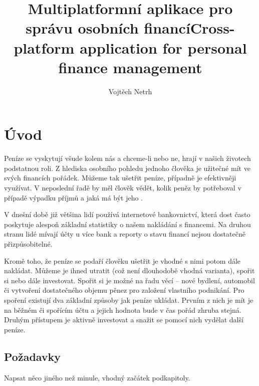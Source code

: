 \documentclass[
  biblatex,
  figures=true,
  tables=false,
  glossaries,
  index
]{kidiplom}
\title{Multiplatformní aplikace pro správu osobních financí}
\title[english]{Cross-platform application for personal finance management}
\author{Vojtěch Netrh}
\begin{document}
\maketitle



\newcommand{\BibLaTeX}{\textsc{Bib}\LaTeX}


\section{Úvod}
Peníze se vyskytují všude kolem nás a chceme-li nebo ne, hrají v našich životech podstatnou roli. Z hlediska osobního pohledu jednoho člověka je užitečné mít ve svých financích pořádek. Můžeme tak ušetřit peníze, případně je efektivněji využívat. V neposlední řadě by měl člověk vědět, kolik peněz by potřeboval v případě výpadku příjmů a jaká má být jeho .

V dnešní době již většina lidí používá internetové bankovnictví, která dost často poskytuje alespoň základní statistiky o našem nakládání s financemi. Na druhou stranu lidé mívají účty u více bank a reporty o stavu financí nejsou dostatečně přizpůsobitelné.

Kromě toho, že peníze se podaří člověku ušetřit je vhodné s nimi potom dále nakládat. Můžeme je ihned utratit (což není dlouhodobě vhodná varianta), spořit si nebo dále investovat. Spořit si je možné na řadu věcí -- nové bydlení, automobil či vytvoření dostatečného objemu pěnez pro založení vlastního podnikání. Pro spoření existují dva základní způsoby jak peníze ukládat. Prvním z nich je mít je na běžném či spořícím účtu a jejich hodnota bude v čas pořád zhruba stejná. Druhým přístupem je aktivně investovat a snažit se pomocí nich vydělat další peníze.

\subsection{Požadavky}
Napsat něco jiného než minule, vhodný začátek podkapitoly.
\end{document}

